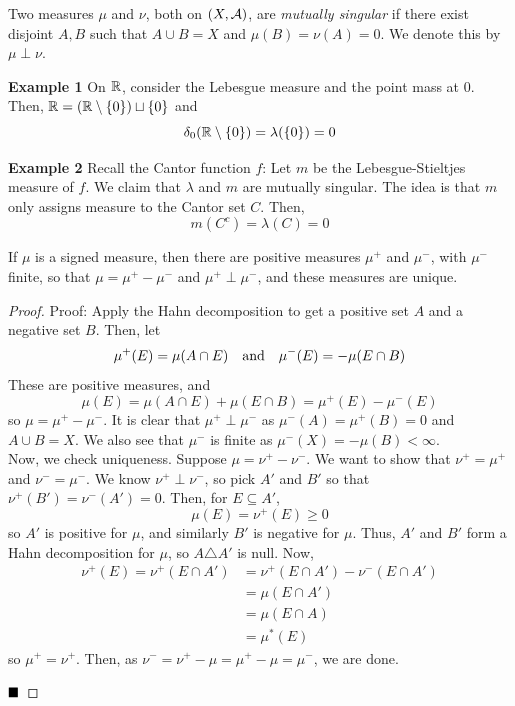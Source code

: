 \begin{definition}
    Two measures $\mu$ and $\nu$, both on $(X, \cal{A})$, are \emph{mutually singular} if there exist disjoint $A, B$ such that $A \cup B = X$ and $\mu(B) = \nu(A) = 0$. We denote this by $\mu \perp \nu$.
\end{definition}

\begin{example}{\textbf{Example 1}}
    On $\R$, consider the Lebesgue measure and the point mass at $0$. Then, $\R = (\R \setminus \{0\}) \sqcup \{0\}$ and
    \[ \delta_0(\R \setminus \{0\}) = \lambda(\{0\}) = 0 \]
\end{example}

\begin{example}{\textbf{Example 2}}
    Recall the Cantor function $f$:
    Let $m$ be the Lebesgue-Stieltjes measure of $f$. We claim that $\lambda$ and $m$ are mutually singular. The idea is that $m$ only assigns measure to the Cantor set $C$. Then,
    \[ m(C^{c}) = \lambda(C) = 0 \]
\end{example}

\begin{theorem}
    If $\mu$ is a signed measure, then there are positive measures $\mu^{+}$ and $\mu^{-}$, with $\mu^{-}$ finite, so that $\mu = \mu^{+} - \mu^{-}$ and $\mu^{+} \perp \mu^{-}$, and these measures are unique.
\end{theorem}
\begin{proof}{Proof:}
    Apply the Hahn decomposition to get a positive set $A$ and a negative set $B$. Then, let
    \[ \mu^{+}(E) = \mu(A \cap E) \quand \mu^{-}(E) = -\mu(E \cap B) \]
    These are positive measures, and
    \[ \mu(E) = \mu(A \cap E) + \mu(E \cap B) = \mu^{+}(E) - \mu^{-}(E) \]
    so $\mu = \mu^{+} - \mu^{-}$. It is clear that $\mu^{+} \perp \mu^{-}$ as $\mu^{-}(A) = \mu^{+}(B) = 0$ and $A \cup B = X$. We also see that $\mu^{-}$ is finite as $\mu^{-}(X) = -\mu(B) < \infty$. \\

    Now, we check uniqueness. Suppose $\mu = \nu^{+} - \nu^{-}$. We want to show that $\nu^{+} = \mu^{+}$ and $\nu^{-} = \mu^{-}$. We know $\nu^{+} \perp \nu^{-}$, so pick $A'$ and $B'$ so that $\nu^{+}(B') = \nu^{-}(A') = 0$. Then, for $E \subseteq A'$,
    \[ \mu(E) = \nu^{+}(E) \geq 0 \]
    so $A'$ is positive for $\mu$, and similarly $B'$ is negative for $\mu$. Thus, $A'$ and $B'$ form a Hahn decomposition for $\mu$, so $A \triangle A'$ is null. Now,
    \begin{align*}
        \nu^{+}(E) = \nu^{+}(E \cap A') &= \nu^{+}(E \cap A') - \nu^{-}(E \cap A')\\
        &= \mu(E \cap A')\\
        &= \mu(E \cap A)\\
        &= \mu^{*}(E)
    \end{align*}
    so $\mu^{+} = \nu^{+}$. Then, as $\nu^{-} = \nu^{+} - \mu = \mu^{+} - \mu = \mu^{-}$, we are done.

    $\qed$
\end{proof}
